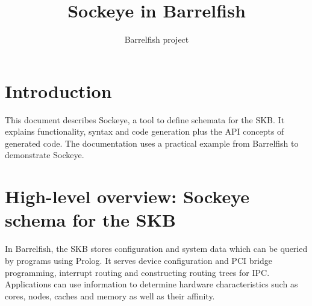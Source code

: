 \documentclass[a4paper,11pt,twoside]{report}
\title{Sockeye in Barrelfish}
\author{Barrelfish project}
\begin{document}
\maketitle			%

\begin{versionhistory}
\end{versionhistory}

\tableofcontents		%
\cleardoublepage
\setcounter{secnumdepth}{2}

\newcommand{\fnname}[1]{\textit{\texttt{#1}}}%
\newcommand{\datatype}[1]{\textit{\texttt{#1}}}%
\newcommand{\varname}[1]{\texttt{#1}}%
\newcommand{\keywname}[1]{\textbf{\texttt{#1}}}%
\newcommand{\pathname}[1]{\texttt{#1}}%
\newcommand{\tabindent}{\hspace*{3ex}}%

\lstset{
  language=sockeye,
  basicstyle=\ttfamily \small,
  keywordstyle=\bfseries,
  boxpos=t,
  captionpos=b
}

\chapter{Introduction}
\label{chap:introduction}

This document describes Sockeye, a tool to define schemata for the SKB. It
explains functionality, syntax and code generation plus the API concepts of
generated code. The documentation uses a practical example from Barrelfish to
demonstrate Sockeye.

\chapter{High-level overview: Sockeye schema for the SKB}
\label{chap:overview}

In Barrelfish, the SKB stores configuration and system data which can be queried
by programs using Prolog. It serves device configuration and
PCI bridge programming, interrupt routing and constructing routing trees for
IPC. Applications can use information to determine hardware characteristics such
as cores, nodes, caches and memory as well as their affinity.
\end{document}
